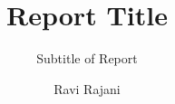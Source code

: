 \documentclass[style=report,nohead]{tablet}
\title{Report Title}%
\subtitle{Subtitle of Report}
\author{Ravi Rajani}
\begin{document}
\def\subbib{}
\maketitle
\tableofcontents
%
\end{document}
